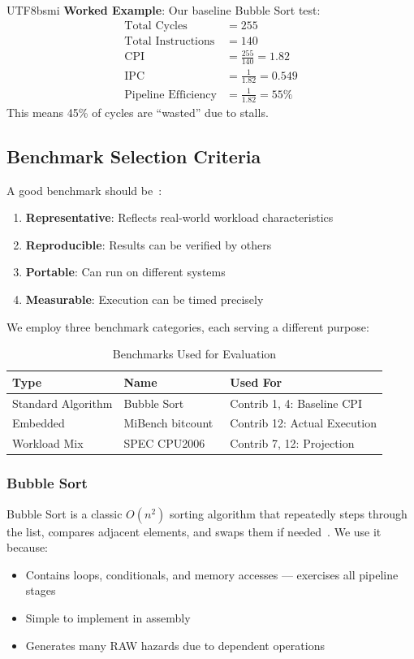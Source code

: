 \documentclass[journal,twoside]{IEEEtran}
\begin{document}
\begin{CJK}{UTF8}{bsmi}
\textbf{Worked Example}: Our baseline Bubble Sort test:
\begin{align*}
\text{Total Cycles} &= 255 \\
\text{Total Instructions} &= 140 \\
\text{CPI} &= \frac{255}{140} = 1.82 \\
\text{IPC} &= \frac{1}{1.82} = 0.549 \\
\text{Pipeline Efficiency} &= \frac{1}{1.82} = 55\%
\end{align*}
This means 45\% of cycles are ``wasted'' due to stalls.

\subsection{Benchmark Selection Criteria}
A good benchmark should be~\cite{hennessy2017computer}:
\begin{enumerate}
    \item \textbf{Representative}: Reflects real-world workload characteristics
    \item \textbf{Reproducible}: Results can be verified by others
    \item \textbf{Portable}: Can run on different systems
    \item \textbf{Measurable}: Execution can be timed precisely
\end{enumerate}

We employ three benchmark categories, each serving a different purpose:

\begin{table}[!t]
\centering
\caption{Benchmarks Used for Evaluation}
\label{tab:benchmarks}
\footnotesize
\begin{tabular}{@{}p{1.8cm}p{2cm}p{3.5cm}@{}}
\toprule
\textbf{Type} & \textbf{Name} & \textbf{Used For} \\
\midrule
Standard Algorithm & Bubble Sort~\cite{knuth1998art} & Contrib 1, 4: Baseline CPI \\
Embedded & MiBench bitcount~\cite{guthaus2001mibench} & Contrib 12: Actual Execution \\
Workload Mix & SPEC CPU2006~\cite{phansalkar2007analysis} & Contrib 7, 12: Projection \\
\bottomrule
\end{tabular}
\end{table}

\subsubsection{Bubble Sort}
Bubble Sort is a classic $O(n^2)$ sorting algorithm that repeatedly steps through the list, compares adjacent elements, and swaps them if needed~\cite{knuth1998art}. We use it because:
\begin{itemize}
    \item Contains loops, conditionals, and memory accesses --- exercises all pipeline stages
    \item Simple to implement in assembly
    \item Generates many RAW hazards due to dependent operations
\end{itemize}


\end{CJK}
\end{document}
